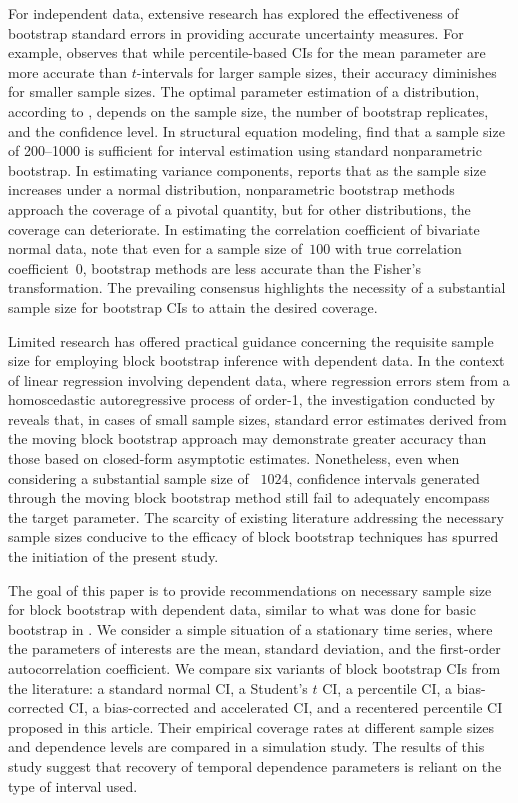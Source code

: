 \documentclass[10pt]{article}
\begin{document}
For independent data, extensive research has explored the effectiveness of
bootstrap standard errors in providing accurate uncertainty measures. For 
example, \citet{hesterberg2015teachers} observes that while percentile-based CIs 
for the mean parameter are more accurate than $t$-intervals for larger sample 
sizes, their accuracy diminishes for smaller sample sizes. The optimal parameter 
estimation of a distribution, according to \citet{chernick2009revisiting}, 
depends on the sample size, the number of bootstrap replicates, and the 
confidence level. In structural equation modeling, \citet{nevitt2001performance} 
find that a sample size of 200--1000 is sufficient for interval estimation using 
standard nonparametric bootstrap. In estimating variance components, 
\citet{burch2012nonparametric} reports that as the sample size increases under a 
normal distribution, nonparametric bootstrap methods approach the coverage of a 
pivotal quantity, but for other distributions, the coverage can deteriorate. In 
estimating the correlation coefficient of bivariate normal data, 
\citet{puth2015variety} note that even for a sample size of~$100$ with true 
correlation coefficient~0, bootstrap methods are less accurate than the Fisher's 
transformation. The prevailing consensus highlights the necessity of a 
substantial sample size for bootstrap CIs to attain the desired coverage.


Limited research has offered practical guidance concerning the requisite sample
size for employing block bootstrap inference with dependent data. In the context 
of linear regression involving dependent data, where regression errors stem from 
a homoscedastic autoregressive process of order-1, the investigation conducted 
by \citet{goncalves2005bootstrap} reveals that, in cases of small sample sizes, 
standard error estimates derived from the moving block bootstrap approach may 
demonstrate greater accuracy than those based on closed-form asymptotic 
estimates. Nonetheless, even when considering a substantial sample size of 
~$1024$, confidence intervals generated through the moving block bootstrap 
method still fail to adequately encompass the target parameter. The scarcity of 
existing literature addressing the necessary sample sizes conducive to the 
efficacy of block bootstrap techniques has spurred the initiation of the present 
study.


The goal of this paper is to provide recommendations on necessary sample size 
for block bootstrap with dependent data, similar to what was done for basic 
bootstrap in \citet{hesterberg2015teachers}. We consider a simple situation of 
a stationary time series, where the parameters of interests are the mean, 
standard deviation, and the first-order autocorrelation coefficient. We compare 
six variants of block bootstrap CIs from the 
literature:\citep{diciccio1996bootstrap, rice2006mathematical}
a standard normal CI, a 
Student's $t$ CI, a percentile CI, a bias-corrected CI, a bias-corrected and 
accelerated CI, and a recentered percentile CI proposed in this article. Their 
empirical coverage rates at different sample sizes and dependence levels are 
compared in a simulation study. The results of this study suggest that recovery 
of temporal dependence parameters is reliant on the type of interval used.
\end{document}
